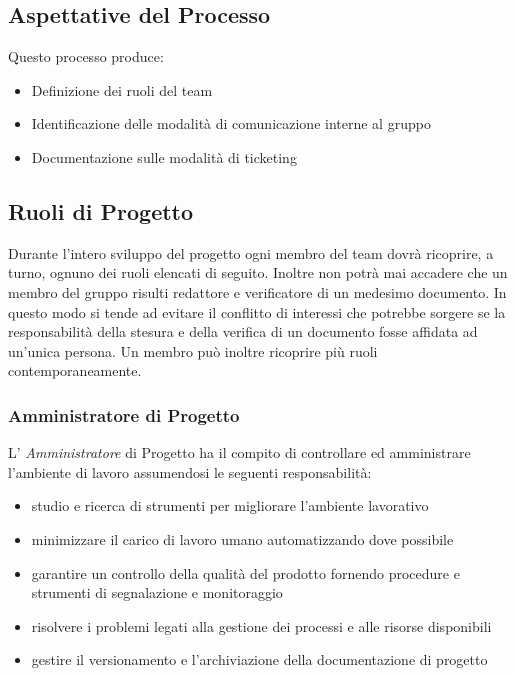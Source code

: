 \subsection{Aspettative del Processo}
Questo processo produce:
\begin{itemize}
	\item Definizione dei ruoli del team
	\item Identificazione delle modalità di comunicazione interne al gruppo
	\item Documentazione sulle modalità di ticketing
\end{itemize}

\subsection{Ruoli di Progetto}

Durante l’intero sviluppo del progetto  ogni membro del team dovrà ricoprire, a
turno, ognuno dei ruoli elencati di seguito.
Inoltre non potrà mai accadere che un membro del gruppo risulti redattore e verificatore di un
medesimo documento. In questo modo si tende ad evitare il conflitto di interessi che potrebbe sorgere se la responsabilità della stesura e della verifica di un documento fosse affidata ad
un’unica persona. Un membro può inoltre ricoprire più ruoli contemporaneamente.

\subsubsection{Amministratore di Progetto} 
L' \emph{Amministratore}  di Progetto ha il compito di controllare ed
amministrare l'ambiente di lavoro assumendosi le seguenti
responsabilità: 
\begin{itemize}
	\item studio e ricerca di strumenti per migliorare l'ambiente lavorativo
	\item minimizzare il carico di lavoro umano automatizzando dove possibile
	\item garantire un controllo della qualità del prodotto fornendo procedure e strumenti di segnalazione e monitoraggio
	\item risolvere i problemi legati alla gestione dei processi e alle risorse disponibili
	\item gestire il versionamento e l'archiviazione della documentazione di progetto
\end{itemize}
